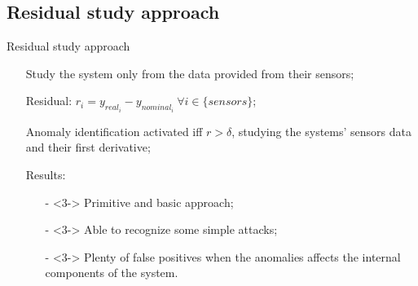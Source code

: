 \documentclass{beamer}
\def\itemizespace{\vspace{7mm}}
\begin{document}
\subsection{Residual study approach}
\begin{frame}{Residual study approach}
	\begin{itemize}[<+->]
		\item[] Study the system only from the data provided from their sensors;

		\itemizespace%

		\item[] Residual: $ r_i = y_{real_i} - y_{nominal_i} \ \forall i \in
			\{sensors\}$;

		\itemizespace%

		\item[] Anomaly identification activated iff $ r > \delta $, studying
			the systems' sensors data and their first derivative;

		\itemizespace%

		\item[] Results:
			\begin{itemize}
				\item[-]<3-> Primitive and basic approach;
				\item[-]<3-> Able to recognize some simple attacks;
				\item[-]<3-> Plenty of false positives when the anomalies
					affects the internal components of the system.
			\end{itemize}

	\end{itemize}
\end{frame}
\end{document}
